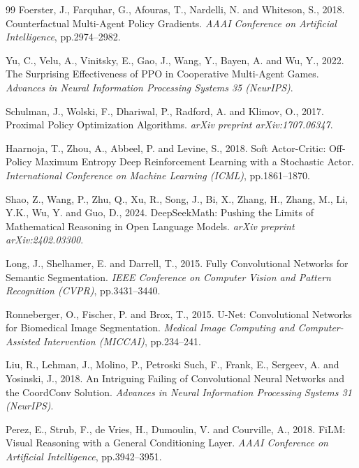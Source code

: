 \begin{thebibliography}{99}
Foerster, J., Farquhar, G., Afouras, T., Nardelli, N. and Whiteson, S., 2018.
Counterfactual Multi-Agent Policy Gradients.
\textit{AAAI Conference on Artificial Intelligence}, pp.2974--2982.

Yu, C., Velu, A., Vinitsky, E., Gao, J., Wang, Y., Bayen, A. and Wu, Y., 2022.
The Surprising Effectiveness of PPO in Cooperative Multi-Agent Games.
\textit{Advances in Neural Information Processing Systems 35 (NeurIPS)}.

Schulman, J., Wolski, F., Dhariwal, P., Radford, A. and Klimov, O., 2017.
Proximal Policy Optimization Algorithms.
\textit{arXiv preprint arXiv:1707.06347}.

Haarnoja, T., Zhou, A., Abbeel, P. and Levine, S., 2018.
Soft Actor-Critic: Off-Policy Maximum Entropy Deep Reinforcement Learning with a
Stochastic Actor.
\textit{International Conference on Machine Learning (ICML)}, pp.1861--1870.

Shao, Z., Wang, P., Zhu, Q., Xu, R., Song, J., Bi, X., Zhang, H., Zhang, M.,
Li, Y.K., Wu, Y. and Guo, D., 2024.
DeepSeekMath: Pushing the Limits of Mathematical Reasoning in Open Language Models.
\textit{arXiv preprint arXiv:2402.03300}.

Long, J., Shelhamer, E. and Darrell, T., 2015.
Fully Convolutional Networks for Semantic Segmentation.
\textit{IEEE Conference on Computer Vision and Pattern Recognition (CVPR)},
pp.3431--3440.

Ronneberger, O., Fischer, P. and Brox, T., 2015.
U-Net: Convolutional Networks for Biomedical Image Segmentation.
\textit{Medical Image Computing and Computer-Assisted Intervention (MICCAI)},
pp.234--241.

Liu, R., Lehman, J., Molino, P., Petroski Such, F., Frank, E., Sergeev, A. and
Yosinski, J., 2018.
An Intriguing Failing of Convolutional Neural Networks and the CoordConv Solution.
\textit{Advances in Neural Information Processing Systems 31 (NeurIPS)}.

Perez, E., Strub, F., de Vries, H., Dumoulin, V. and Courville, A., 2018.
FiLM: Visual Reasoning with a General Conditioning Layer.
\textit{AAAI Conference on Artificial Intelligence}, pp.3942--3951.


\end{thebibliography}
